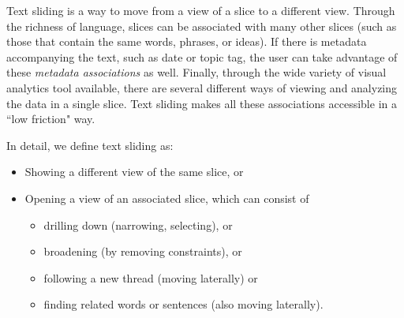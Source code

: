 \documentclass{sig-alternate}
\begin{document}
Text sliding is a way to move from a view of a slice to a different view. Through the richness of language, slices can be associated with many other slices (such as those that contain the same  words, phrases, or ideas). If there is metadata accompanying the text, such as date or topic tag, the user can take advantage of these  \emph{metadata associations} as well.  Finally, through the wide variety of visual analytics tool available, there are several different ways of viewing and analyzing the data in a single slice. Text sliding makes all these associations accessible in a ``low friction" way.

In detail, we define text sliding as:
\begin{itemize}
	\item Showing a different view of the same slice, or
	\item Opening a  view of an associated slice, which can consist of
	\begin{itemize}
	  \item drilling down (narrowing, selecting), or
	  \item broadening (by removing constraints), or
	  \item following a new thread (moving laterally) or
	  \item finding related words or sentences  (also moving laterally).
	 \end{itemize}
\end{itemize}
\end{document}
